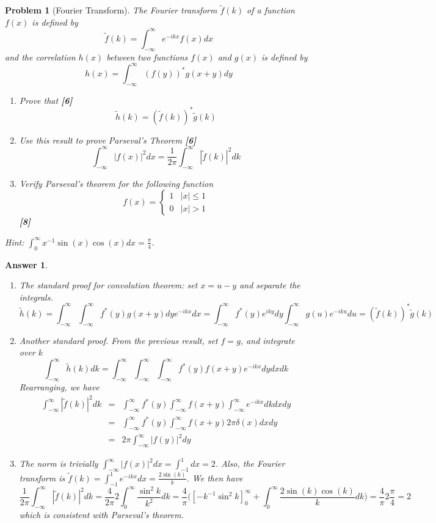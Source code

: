 \documentclass[a4paper]{article}
\newtheorem{ans}{Answer}[section]
\theoremstyle{new}
\newtheorem{qns}{Problem}[section]
\begin{document}
\begin{qns}[Fourier Transform]
The Fourier transform $\tilde{f}(k)$ of a function $f(x)$ is defined by
$$\tilde{f}(k)=\int_{-\infty}^\infty e^{-ikx}f(x)dx$$
and the correlation $h(x)$ between two functions $f(x)$ and $g(x)$ is defined by
$$h(x)=\int_{-\infty}^\infty(f(y))^*g(x+y)dy$$
\begin{enumerate}[label=(\roman*)]
\item Prove that \hfill \textbf{[6]} $$\tilde{h}(k)=(\tilde{f}(k))^*\tilde{g}(k)$$
\item Use this result to prove Parseval's Theorem \hfill \textbf{[6]}
$$\int_{-\infty}^\infty|f(x)|^2dx=\frac{1}{2\pi}\int_{-\infty}^\infty|\tilde{f}(k)|^2dk$$
\item Verify Parseval's theorem for the following function
$$f(x)=
\left\{
        \begin{array}{ll}
      1 & |x|\leq 1 \\
      0 & |x|>1
        \end{array}
    \right.$$\hfill \textbf{[8]}
\end{enumerate}
Hint: $\int_0^\infty x^{-1}\sin(x)\cos(x)dx=\frac{\pi}{4}$.
\end{qns}
\begin{ans}\leavevmode
\begin{enumerate}[label=(\roman*)]
\item The standard proof for convolution theorem: set $x=u-y$ and separate the integrals.
$$\tilde{h}(k)=\int_{-\infty}^\infty\int_{-\infty}^\infty f^*(y)g(x+y)dye^{-ikx}dx=\int_{-\infty}^\infty f^*(y)e^{iky}dy\int_{-\infty}^\infty g(u)e^{-iku}du=(\tilde{f}(k))^*\tilde{g}(k)$$
\item Another standard proof. From the previous result, set $f=g$, and integrate over $k$
$$\int_{-\infty}^\infty\tilde{h}(k)dk=\int_{-\infty}^\infty\int_{-\infty}^\infty\int_{-\infty}^\infty f^*(y)f(x+y)e^{-ikx}dydxdk$$
Rearranging, we have
\begin{eqnarray}
\int_{-\infty}^\infty|\tilde{f}(k)|^2dk&=&\int_{-\infty}^\infty f^*(y)\int_{-\infty}^\infty f(x+y)\int_{-\infty}^\infty e^{-ikx}dkdxdy\nonumber\\&=&\int_{-\infty}^\infty f^*(y)\int_{-\infty}^\infty f(x+y)2\pi\delta(x)dxdy\nonumber\\&=&2\pi\int_{-\infty}^\infty|f(y)|^2dy\nonumber
\end{eqnarray}
\item The norm is trivially $\int_{-\infty}^\infty|f(x)|^2dx=\int_{-1}^1dx=2$. Also, the Fourier transform is $\tilde{f}(k)=\int_{-1}^1e^{-ikx}dx=\frac{2\sin(k)}{k}$. We then have
$$\frac{1}{2\pi}\int_{-\infty}^\infty|\tilde{f}(k)|^2dk=\frac{4}{2\pi}2\int_0^\infty\frac{\sin^2k}{k^2}dk=\frac{4}{\pi}\bigg([-k^{-1}\sin^2k]^\infty_0+\int_0^\infty\frac{2\sin(k)\cos(k)}{k}dk\bigg)=\frac{4}{\pi}2\frac{\pi}{4}=2$$
which is consistent with Parseval's theorem.
\end{enumerate}
\end{ans}
\end{document}
